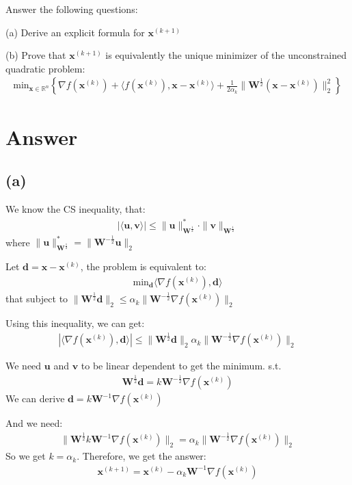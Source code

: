 \documentclass{article}
\newcommand{\R}{\mathbb{R}}
\begin{document}
Answer the following questions:

(a) Derive an explicit formula for \(\bm{x}^{(k + 1)}\)

(b) Prove that \(\bm{x}^{(k + 1)}\) is equivalently the unique minimizer of the unconstrained quadratic problem:
\begin{align*}
    \text{min}_{\bm{x} \in \R^n} \left \{ \nabla f(\bm{x}^{(k)}) + \langle f(\bm{x}^{(k)}), \bm{x} - \bm{x}^{(k)} \rangle + \frac{1}{2\alpha_k} \|\bm{W}^{\frac{1}{2}} (\bm{x} - \bm{x}^{(k)})\|_2^2 \right \}
\end{align*}

\section*{Answer}
\subsection*{(a)}
We know the CS inequality, that:
\begin{align*}
    |\langle \bm{u}, \bm{v} \rangle| \leq \|\bm{u}\|_{\bm{W}^{\frac{1}{2}}}^* \cdot \|\bm{v}\|_{\bm{W}^{\frac{1}{2}}}
\end{align*}
where \(\|\bm{u}\|_{\bm{W}^{\frac{1}{2}}}^* = \|\bm{W}^{-\frac{1}{2}} \bm{u}\|_2\)

Let \(\bm{d} = \bm{x} - \bm{x}^{(k)}\), the problem is equivalent to:
\begin{align*}
    \text{min}_{\bm{d}} \langle \nabla f(\bm{x}^{(k)}), \bm{d} \rangle
\end{align*}
that subject to \(\|\bm{W}^{\frac{1}{2} }\bm{d}\|_2 \leq \alpha_k\|\bm{W}^{-\frac{1}{2}} \nabla f(\bm{x}^{(k)})\|_2\)

Using this inequality, we can get:
\begin{align*}
    |\langle \nabla f(\bm{x}^{(k)}), \bm{d}\rangle| \leq \|\bm{W}^{\frac{1}{2} }\bm{d}\|_2 \alpha_k\|\bm{W}^{-\frac{1}{2}} \nabla f(\bm{x}^{(k)})\|_2
\end{align*}

We need \(\bm{u}\) and \(\bm{v}\) to be linear dependent to get the minimum. s.t.
\begin{align*}
    \bm{W}^{\frac{1}{2} }\bm{d}  = k \bm{W}^{-\frac{1}{2}} \nabla f(\bm{x}^{(k)})
\end{align*}
We can derive \(\bm{d} = k \bm{W}^{-1} \nabla f(\bm{x}^{(k)})\)

And we need:
\begin{align*}
    \|\bm{W}^{\frac{1}{2}}k \bm{W}^{-1} \nabla f(\bm{x}^{(k)})\|_2 = \alpha_k\|\bm{W}^{-\frac{1}{2}} \nabla f(\bm{x}^{(k)})\|_2
\end{align*}
So we get \(k = \alpha_k\). Therefore, we get the answer:
\begin{align*}
    \bm{x}^{(k + 1)} = \bm{x}^{(k)} - \alpha_k \bm{W}^{-1} \nabla f(\bm{x}^{(k)})
\end{align*}
\end{document}
